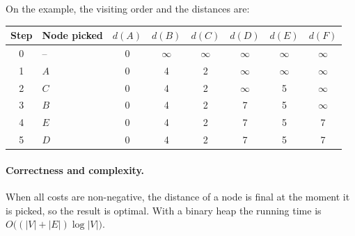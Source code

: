 \documentclass[11pt,a4paper]{article}
\begin{document}
\begin{center}
\end{center}

On the example, the visiting order and the distances are:

\begin{center}
\begin{tabular}{clcccccc}
\toprule
Step & Node picked & $d(A)$ & $d(B)$ & $d(C)$ & $d(D)$ & $d(E)$ & $d(F)$ \\
\midrule
0 & --  & 0 & $\infty$ & $\infty$ & $\infty$ & $\infty$ & $\infty$ \\
1 & $A$ & 0 & 4 & 2 & $\infty$ & $\infty$ & $\infty$ \\
2 & $C$ & 0 & 4 & 2 & $\infty$ & 5 & $\infty$ \\
3 & $B$ & 0 & 4 & 2 & 7 & 5 & $\infty$ \\
4 & $E$ & 0 & 4 & 2 & 7 & 5 & 7 \\
5 & $D$ & 0 & 4 & 2 & 7 & 5 & 7 \\
\bottomrule
\end{tabular}
\end{center}

\paragraph{Correctness and complexity.}
When all costs are non-negative, the distance of a node is final at the moment it is picked, so the
result is optimal. With a binary heap the running time is $O\bigl((|V|+|E|)\log|V|\bigr)$.
\end{document}
